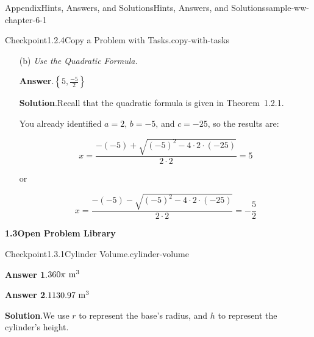 \documentclass[oneside,10pt,]{book}
\newcommand{\blocktitlefont}{\relax}
\newcommand{\lititle}[1]{{\slshape#1}}
\numberwithin{equation}{section}
\begin{document}
\begin{solutions-chapter}{Appendix}{Hints, Answers, and Solutions}{}{Hints, Answers, and Solutions}{}{}{sample-ww-chapter-6-1}
\begin{inlinesolution}{Checkpoint}{1.2.4}{Copy a Problem with Tasks.}{copy-with-tasks}
\begin{enumerate}[font=\bfseries,label=(\alph*),ref=\alph*]
\par\smallskip%
\noindent\textbf{\blocktitlefont Solution}.\hypertarget{copy-with-tasks-3-6-back}{}\quad{}Take the coefficient of \(x^2\) for the value of \(a\text{,}\) the coefficient of \(x\) for \(b\text{,}\) and the constant for \(c\text{.}\) \emph{In this case}, they are \(a = {2}\text{,}\) \(b = {-5}\text{,}\) \(c = {-25}\text{.}\)%
\item[(b)]\lititle{Use the Quadratic Formula.}\par%
\par\smallskip%
\noindent\textbf{\blocktitlefont Answer}.\hypertarget{copy-with-tasks-4-3-back}{}\quad{}\(\left\{5,\frac{-5}{2}\right\}\)%
\par\smallskip%
\noindent\textbf{\blocktitlefont Solution}.\hypertarget{copy-with-tasks-4-4-back}{}\quad{}Recall that the quadratic formula is given in Theorem~1.2.1.%
\par
You already identified \(a = {2}\text{,}\) \(b = {-5}\text{,}\) and \(c = {-25}\text{,}\) so the results are:%
\par
%
\begin{equation*}
x = {\frac{-\left(-5\right)+\sqrt{\left(-5\right)^{2}-4\cdot 2\cdot \left(-25\right)}}{2\cdot 2}} = {5}
\end{equation*}
%
\par
or%
\par
%
\begin{equation*}
x = {\frac{-\left(-5\right)-\sqrt{\left(-5\right)^{2}-4\cdot 2\cdot \left(-25\right)}}{2\cdot 2}} = {-{\frac{5}{2}}}
\end{equation*}
%
\end{enumerate}%
\end{inlinesolution}%
\par\medskip
\noindent\textbf{\Large{}1.3\space\textperiodcentered\space{}Open Problem Library}
\begin{inlinesolution}{Checkpoint}{1.3.1}{Cylinder Volume.}{cylinder-volume}%
\par\smallskip%
\noindent\textbf{\blocktitlefont Answer 1}.\hypertarget{cylinder-volume-3-back}{}\quad{}\(360\pi\ {\rm m^{3}}\)%
\par\smallskip%
\noindent\textbf{\blocktitlefont Answer 2}.\hypertarget{cylinder-volume-4-back}{}\quad{}\(1130.97\ {\rm m^{3}}\)%
\par\smallskip%
\noindent\textbf{\blocktitlefont Solution}.\hypertarget{cylinder-volume-5-back}{}\quad{}We use \(r\) to represent the base's radius, and \(h\) to represent the cylinder's height.%

\end{inlinesolution}
\end{solutions-chapter}
\end{document}
